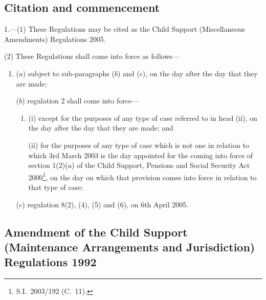 \documentclass[12pt,a4paper]{article}
\begin{document}
\bigskip

\setcounter{secnumdepth}{-2}

\subsection[1. Citation and commencement]{Citation and commencement}

1.---(1)  These Regulations may be cited as the Child Support (Miscellaneous Amendments) Regulations 2005.

(2) These Regulations shall come into force as follows—
\begin{enumerate}\item[]
($a$) subject to sub-paragraphs ($b$)  and ($c$), on the day after the day that they are made;

($b$) regulation 2 shall come into force—
\begin{enumerate}\item[]
(i) except for the purposes of any type of case referred to in head (ii), on the day after the day that they are made; and

(ii) for the purposes of any type of case which is not one in relation to which 3rd March 2003 is the day appointed for the coming into force of section 1(2)($a$)  of the Child Support, Pensions and Social Security Act 2000\footnote{S.I.\ 2003/192 (C.\ 11).}, on the day on which that provision comes into force in relation to that type of case;
\end{enumerate}

($c$) regulation 8(2), (4), (5) and (6), on 6th April 2005.
\end{enumerate}

\subsection[2. Amendment of the Child Support (Maintenance Arrangements and Jurisdiction) Regulations 1992]{\sloppy Amendment of the Child Support (Maintenance Arrangements and Jurisdiction) Regulations 1992}
\end{document}
